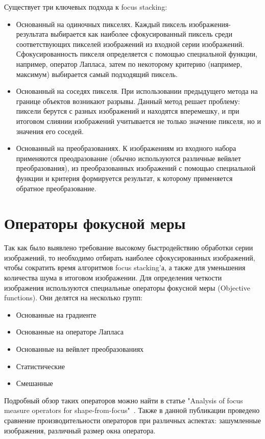 \documentclass[14pt]{matmex-diploma-custom}
\begin{document}
Существует три ключевых подхода к focus stacking: 
\begin{itemize}
    \item Основанный на одиночных пикселях. Каждый пиксель изображения-результата выбирается как наиболее сфокусированный пиксель среди соответствующих пикселей изображений из входной серии изображений. Сфокусированность пикселя  определяется с помощью специальной функции, например, оператор Лапласа, затем по некоторому критерию (например, максимум) выбирается самый подходящий пиксель.
    \item Основанный на соседях пикселя. При использовании предыдущего метода на границе объектов возникают разрывы. Данный метод решает проблему: пиксели берутся с разных изображений и находятся вперемешку, и при итоговом слиянии изображений учитывается не только значение пикселя, но и значения его соседей.
    \item Основанный на преобразованиях. К изображениям из входного набора применяются преодразование (обычно используются различные вейвлет преобразования), из преобразованных изображений с помощью специальной функции и критерия формируется результат, к которому применяется обратное преобразование.
\end{itemize}

\section{Операторы фокусной меры}
Так как было выявлено требование высокому быстродействию обработки серии изображений, то необходимо отбирать наиболее сфокусированных изображений, чтобы сократить время алгоритмов focus stacking'а, а также для уменьшения количества шума в итоговом изображении. Для определения четкости изображения используются специальные операторы фокусной меры (Objective functions). Они делятся на несколько групп:
\begin{itemize}
    \item Основанные на градиенте
    \item Основанные на операторе Лапласа
    \item Основанные на вейвлет преобразованиях
    \item Статистические
    \item Смешанные
\end{itemize}

Подробный обзор таких операторов можно найти в статье "Analysis of focus measure operators for shape-from-focus"~\cite{MeasureOperators}. Также в данной публикации проведено сравнение производительности операторов при различных аспектах: зашумленные изображения, различный размер окна оператора. 
\end{document}
